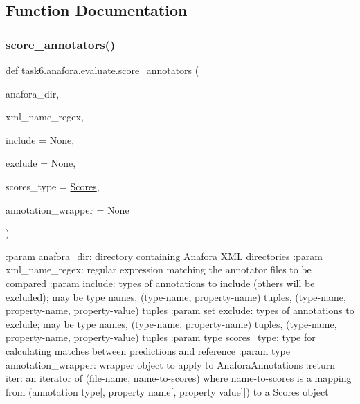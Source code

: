 \subsection{Function Documentation}
\mbox{\label{namespacetask6_1_1anafora_1_1evaluate_a2622d41ca15c96f378cc2359f60a377c}} 
\subsubsection{\texorpdfstring{score\+\_\+annotators()}{score\_annotators()}}
{\footnotesize\ttfamily def task6.\+anafora.\+evaluate.\+score\+\_\+annotators (\begin{DoxyParamCaption}\item[{}]{anafora\+\_\+dir,  }\item[{}]{xml\+\_\+name\+\_\+regex,  }\item[{}]{include = {\ttfamily None},  }\item[{}]{exclude = {\ttfamily None},  }\item[{}]{scores\+\_\+type = {\ttfamily \hyperlink{classtask6_1_1anafora_1_1evaluate_1_1Scores}{Scores}},  }\item[{}]{annotation\+\_\+wrapper = {\ttfamily None} }\end{DoxyParamCaption})}

\begin{DoxyVerb}:param anafora_dir: directory containing Anafora XML directories
:param xml_name_regex: regular expression matching the annotator files to be compared
:param include: types of annotations to include (others will be excluded); may be type names,
    (type-name, property-name) tuples, (type-name, property-name, property-value) tuples
:param set exclude: types of annotations to exclude; may be type names, (type-name, property-name) tuples,
    (type-name, property-name, property-value) tuples
:param type scores_type: type for calculating matches between predictions and reference
:param type annotation_wrapper: wrapper object to apply to AnaforaAnnotations
:return iter: an iterator of (file-name, name-to-scores) where name-to-scores is a mapping from
    (annotation type[, property name[, property value]]) to a Scores object
\end{DoxyVerb}
 \mbox{\label{namespacetask6_1_1anafora_1_1evaluate_a67ad3f84f7848ed120379ec92f0dfa26}} 
